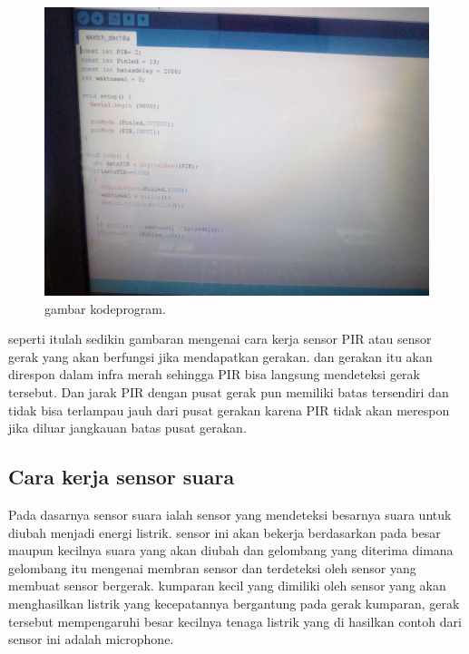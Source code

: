 \begin{figure}[ht]
\centerline{\includegraphics[width=1\textwidth]{figures/kodeprogram.JPG}}
\caption{gambar kodeprogram.}
\label{kodeprogram.JPG}
\end{figure}

seperti itulah sedikin gambaran mengenai cara kerja sensor PIR atau sensor gerak yang akan berfungsi jika mendapatkan gerakan. dan gerakan itu akan direspon dalam infra merah sehingga PIR bisa langsung mendeteksi gerak tersebut. Dan jarak PIR dengan pusat gerak pun memiliki batas tersendiri dan tidak bisa terlampau jauh dari pusat gerakan karena PIR tidak akan merespon jika diluar jangkauan batas pusat gerakan.

\subsection {Cara kerja sensor suara}

Pada dasarnya sensor suara ialah sensor yang mendeteksi besarnya suara untuk diubah menjadi energi listrik. sensor ini akan bekerja berdasarkan pada besar maupun kecilnya suara yang akan diubah dan gelombang yang diterima dimana gelombang itu mengenai membran sensor dan terdeteksi oleh sensor yang membuat sensor bergerak. kumparan kecil yang dimiliki oleh sensor yang akan menghasilkan listrik yang kecepatannya bergantung pada gerak kumparan, gerak tersebut mempengaruhi besar kecilnya tenaga listrik yang di hasilkan contoh dari sensor ini adalah microphone.

